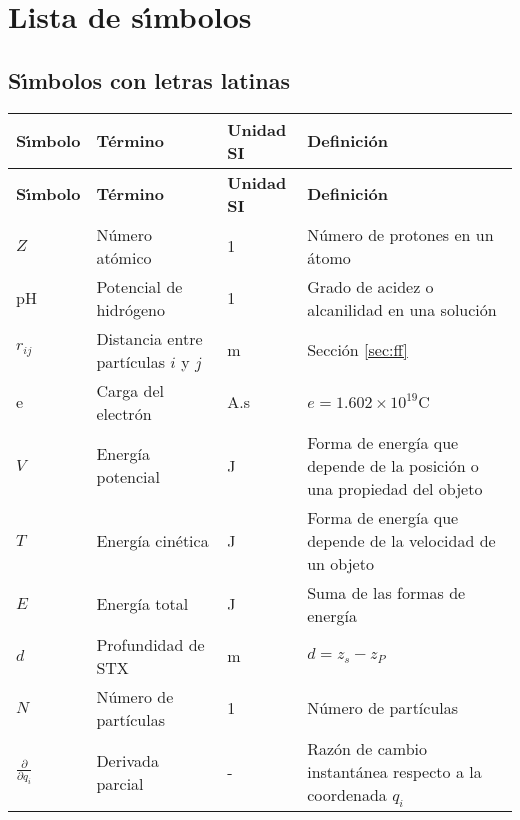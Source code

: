 \chapter*{Lista de s\'{\i}mbolos}
\section*{S\'{\i}mbolos con letras latinas}
 \label{simbolos1}
\begin{longtable}{p{2cm}p{4cm}p{2cm}p{8cm}}
\textbf{S\'{\i}mbolo}&\textbf{T\'{e}rmino}&\textbf{Unidad SI}&\textbf{Definici\'{o}n}\\[0.5ex]\hline
\endfirsthead%
\textbf{S\'{\i}mbolo}&\textbf{T\'{e}rmino}&\textbf{Unidad SI}&\textbf{Definici\'{o}n}\\[0.5ex]\hline
\endhead%
      $Z$&N\'{u}mero at\'{o}mico&\hspace{6pt}1&N\'{u}mero de protones en un \'{a}tomo\\%
      pH &Potencial de hidr\'{o}geno &\hspace{6pt}1&Grado de acidez o alcanilidad en una soluci\'{o}n\\%
      $r_{ij}$&Distancia entre part\'{i}culas $i$ y $j$&\hspace{6pt}m&Secci\'{o}n \ref{sec:ff}\\%
      e&Carga del electr\'{o}n&\hspace{6pt}A.s&$e=1.602\times 10^{19}$C\\%
$V$ &Energ\'{i}a potencial&\hspace{6pt}J&Forma de energ\'{i}a que depende de la posici\'{o}n o una propiedad del objeto\\%
$T$&Energ\'{i}a cin\'{e}tica&\hspace{6pt}J&Forma de energ\'{i}a que depende de la velocidad de un objeto\\%
$E$  &Energ\'{i}a total&\hspace{6pt}J&Suma de las formas de energ\'{i}a\\%
$d$&Profundidad de STX&\hspace{6pt}m&$d=z_s-z_P$\\%
$N$&N\'{u}mero de part\'{i}culas&\hspace{6pt}1&N\'{u}mero de part\'{i}culas\\%
$\frac{\partial}{\partial q_i}$&Derivada parcial&\hspace{6pt}-&Raz\'{o}n de cambio instant\'{a}nea respecto a la coordenada $q_i$\\%

\end{longtable}
